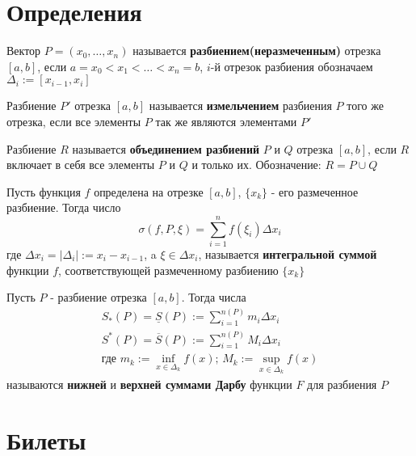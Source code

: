 \documentclass[10pt]{article}
\begin{document}
    \tableofcontents
    \section{Определения}
    \begin{definition}
        Вектор $P = (x_0, \ldots, x_n)$ называется \textbf{разбиением(неразмеченным)} отрезка $[a, b]$, если $a = x_0 < x_1 < \ldots < x_n = b$, $i$-й отрезок разбиения обозначаем $\Delta_i := [x_{i-1}, x_i]$  
    \end{definition}
    \begin{definition}
        Разбиение $P'$ отрезка $[a, b]$ называется \textbf{измельчением} разбиения $P$ того же отрезка, если все элементы $P$ так же являются элементами $P'$
    \end{definition}
    \begin{definition}
        Разбиение $R$ называется \textbf{объединением разбиений} $P$ и $Q$ отрезка $[a, b]$, если $R$ включает в себя все элементы $P$ и $Q$ и только их. Обозначение: $R = P \cup Q$
    \end{definition}
    \begin{definition}
        Пусть функция $f$ определена на отрезке $[a, b]$, $\{x_k\}$ - его размеченное разбиение. Тогда число
        $$
        \sigma(f, P, \xi) = \sum_{i=1}^n f(\xi_i)\Delta x_i
        $$
        где $\Delta x_i = |\Delta_i| := x_i - x_{i-1}$, a $\xi \in \Delta x_i$, называется \textbf{интегральной суммой} функции $f$, соответствующей размеченному разбиению $\{x_k\}$
    \end{definition}
    \begin{definition}
        Пусть $P$ - разбиение отрезка $[a, b]$. Тогда числа
        \begin{gather*}
            S_{*}(P) = \underline{S}(P) := \sum_{i = 1}^{n(P)} m_i \Delta x_i \\
            S^{*}(P) = \overline{S}(P) := \sum_{i = 1}^{n(P)}M_i \Delta x_i\\
            \text{где }m_k := \inf_{x \in \Delta_k}f(x);\, M_k := \sup_{x \in \Delta_k}f(x)
        \end{gather*}
        называются \textbf{нижней} и \textbf{верхней суммами Дарбу} функции $F$ для разбиения $P$ 
    \end{definition}
    \section{Билеты}
\end{document}
